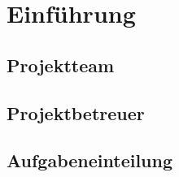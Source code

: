 \chapter{Einführung}

\section{Projektteam}

\section{Projektbetreuer}

\section{Aufgabeneinteilung}
